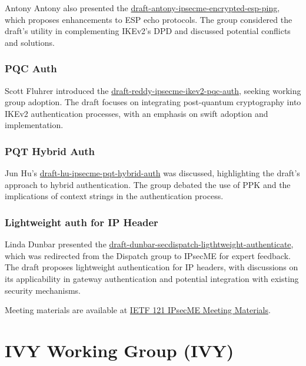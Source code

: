\documentclass{article}
\begin{document}
Antony Antony also presented the \href{https://datatracker.ietf.org/doc/html/draft-antony-ipsecme-encrypted-esp-ping}{draft-antony-ipsecme-encrypted-esp-ping}, which proposes enhancements to ESP echo protocols. The group considered the draft's utility in complementing IKEv2's DPD and discussed potential conflicts and solutions.

\subsubsection{PQC Auth}

Scott Fluhrer introduced the \href{https://datatracker.ietf.org/doc/html/draft-reddy-ipsecme-ikev2-pqc-auth}{draft-reddy-ipsecme-ikev2-pqc-auth}, seeking working group adoption. The draft focuses on integrating post-quantum cryptography into IKEv2 authentication processes, with an emphasis on swift adoption and implementation.

\subsubsection{PQT Hybrid Auth}

Jun Hu's \href{https://datatracker.ietf.org/doc/html/draft-hu-ipsecme-pqt-hybrid-auth}{draft-hu-ipsecme-pqt-hybrid-auth} was discussed, highlighting the draft's approach to hybrid authentication. The group debated the use of PPK and the implications of context strings in the authentication process.

\subsubsection{Lightweight auth for IP Header}

Linda Dunbar presented the \href{https://datatracker.ietf.org/doc/html/draft-dunbar-secdispatch-ligthtweight-authenticate}{draft-dunbar-secdispatch-ligthtweight-authenticate}, which was redirected from the Dispatch group to IPsecME for expert feedback. The draft proposes lightweight authentication for IP headers, with discussions on its applicability in gateway authentication and potential integration with existing security mechanisms.

Meeting materials are available at \href{https://meetings.conf.meetecho.com/ietf121/?group=ipsecme&short=&item=1}{IETF 121 IPsecME Meeting Materials}.



\newpage

\section{IVY Working Group (IVY)}
\end{document}
